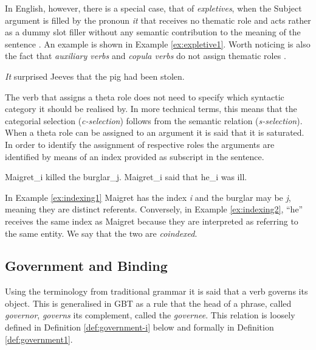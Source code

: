    In English, however, there is a special case, that of \textit{expletives}, when the Subject argument is filled by the pronoun \textit{it} that receives no thematic role and acts rather as a dummy slot filler without any semantic contribution to the meaning of the sentence \citep[62]{Haegeman1991}. An example is shown in Example \ref{ex:expletive1}. Worth noticing is also the fact that \textit{auxiliary verbs} and \textit{copula verbs} do not assign thematic roles \citep{pollock1989verb}. 
    
    \begin{exe}
        \ex\label{ex:expletive1} \textit{It} surprised Jeeves that the pig had been stolen.
    \end{exe}

    The verb that assigns a theta role does not need to specify which syntactic category it should be realised by. In more technical terms, this means that the categorial selection (\textit{c-selection}) follows from the semantic relation (\textit{s-selection}). When a theta role can be assigned to an argument it is said that it is saturated. In order to identify the assignment of respective roles the arguments are identified by means of an index provided as subscript in the sentence.

    \begin{exe}
        \ex\label{ex:indexing1} Maigret_i killed the burglar_j.
        \ex\label{ex:indexing2} Maigret_i said that he_i was ill.
    \end{exe}

    In Example \ref{ex:indexing1} Maigret has the index \textit{i} and the burglar may be \textit{j}, meaning they are distinct referents. Conversely, in Example \ref{ex:indexing2}, ``he'' receives the same index as Maigret because they are interpreted as referring to the same entity. We say that the two are \textit{coindexed}.

\subsection{Government and Binding}

    Using the terminology from traditional grammar it is said that a verb governs its object. This is generalised in GBT as a rule that the head of a phrase, called \textit{governor}, \textit{governs} its complement, called the \textit{governee}. This relation is loosely defined in Definition \ref{def:government-i} below and formally in Definition \ref{def:government1}. 

